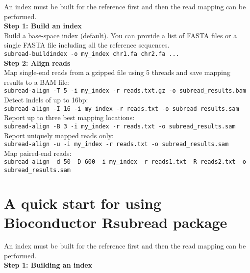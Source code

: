 \documentclass[12pt]{report}
\newcommand{\code}[1]{{\small\texttt{#1}}}
\newcommand{\Rsubread}{\textsf{Rsubread}}
\begin{document}
An index must be built for the reference first and then the read mapping can be performed.\\

{\noindent\bf Step 1: Build an index}\\

\noindent Build a base-space index (default). You can provide a list of FASTA files or a single FASTA file including all the reference sequences.\\

\code{subread-buildindex -o my\_index chr1.fa chr2.fa ...}\\

{\noindent\bf Step 2: Align reads}\\

\noindent Map single-end reads from a gzipped file using 5 threads and save mapping results to a BAM file:\\
\code{subread-align -T 5 -i my\_index -r reads.txt.gz -o subread\_results.bam}\\

\noindent Detect indels of up to 16bp:\\
\code{subread-align -I 16 -i my\_index -r reads.txt -o subread\_results.sam}\\

\noindent Report up to three best mapping locations:\\
\code{subread-align -B 3 -i my\_index -r reads.txt -o subread\_results.sam}\\

\noindent Report uniquely mapped reads only:\\
\code{subread-align -u -i my\_index -r reads.txt -o subread\_results.sam}\\

\noindent Map paired-end reads:\\
\code{subread-align -d 50 -D 600 -i my\_index -r reads1.txt -R reads2.txt \newline -o subread\_results.sam}\\


\section{A quick start for using Bioconductor {\Rsubread} package}

An index must be built for the reference first and then the read mapping can be performed.\\

{\noindent\bf Step 1: Building an index}\\
\end{document}
